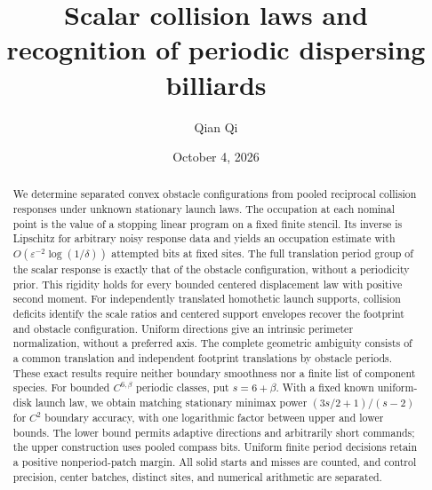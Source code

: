 \documentclass[11pt]{amsart}
\title[Scalar collision laws]{Scalar collision laws and recognition of periodic dispersing billiards}
\author{Qian Qi}
\date{October 4, 2026}
\theoremstyle{definition}\newtheorem{definition}[theorem]{Definition}
\theoremstyle{remark}\newtheorem{remark}[theorem]{Remark}
\numberwithin{equation}{section}
\begin{document}
\raggedbottom
\begin{abstract}
We determine separated convex obstacle configurations from pooled
reciprocal collision responses under unknown stationary launch laws.
The occupation at each nominal point is the value of a stopping linear
program on a fixed finite stencil. Its inverse is Lipschitz for arbitrary
noisy response data and yields an occupation estimate with
$O(\varepsilon^{-2}\log(1/\delta))$ attempted bits at fixed sites.
The full translation period group of the scalar response is exactly
that of the obstacle configuration, without a periodicity prior.
This rigidity holds for every bounded centered displacement law with
positive second moment. For independently translated homothetic launch
supports, collision deficits identify the scale ratios and centered
support envelopes recover the footprint and obstacle configuration.
Uniform directions give an intrinsic perimeter normalization, without
a preferred axis. The complete geometric ambiguity consists of a common
translation and independent footprint translations by obstacle periods.
These exact results require neither boundary smoothness nor a finite
list of component species. For bounded $C^{6,\beta}$ periodic classes,
put $s=6+\beta$. With a fixed known uniform-disk launch law, we obtain
matching stationary minimax power $(3s/2+1)/(s-2)$ for $C^2$ boundary
accuracy, with one logarithmic factor between upper and lower bounds.
The lower bound permits adaptive directions and arbitrarily short
commands; the upper construction uses pooled compass bits.
Uniform finite period decisions retain a positive nonperiod-patch
margin. All solid starts and misses are counted, and control precision,
center batches, distinct sites, and numerical arithmetic are separated.
\end{abstract}
\maketitle
\enlargethispage{2pt}














\appendix












\end{document}
